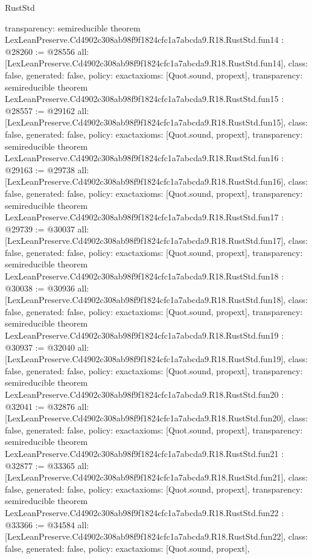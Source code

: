 \begin{lexlean}{RustStd}
\begin{coremodule}
{  transparency: semireducible
}
theorem LexLeanPreserve.Cd4902c308ab98f9f1824cfc1a7abcda9.R18.RustStd.fun14 : @28260 := @28556 {
  all: [LexLeanPreserve.Cd4902c308ab98f9f1824cfc1a7abcda9.R18.RustStd.fun14],
  class: false,
  generated: false,
  policy: exact{axioms: [Quot.sound, propext]},
  transparency: semireducible
}
theorem LexLeanPreserve.Cd4902c308ab98f9f1824cfc1a7abcda9.R18.RustStd.fun15 : @28557 := @29162 {
  all: [LexLeanPreserve.Cd4902c308ab98f9f1824cfc1a7abcda9.R18.RustStd.fun15],
  class: false,
  generated: false,
  policy: exact{axioms: [Quot.sound, propext]},
  transparency: semireducible
}
theorem LexLeanPreserve.Cd4902c308ab98f9f1824cfc1a7abcda9.R18.RustStd.fun16 : @29163 := @29738 {
  all: [LexLeanPreserve.Cd4902c308ab98f9f1824cfc1a7abcda9.R18.RustStd.fun16],
  class: false,
  generated: false,
  policy: exact{axioms: [Quot.sound, propext]},
  transparency: semireducible
}
theorem LexLeanPreserve.Cd4902c308ab98f9f1824cfc1a7abcda9.R18.RustStd.fun17 : @29739 := @30037 {
  all: [LexLeanPreserve.Cd4902c308ab98f9f1824cfc1a7abcda9.R18.RustStd.fun17],
  class: false,
  generated: false,
  policy: exact{axioms: [Quot.sound, propext]},
  transparency: semireducible
}
theorem LexLeanPreserve.Cd4902c308ab98f9f1824cfc1a7abcda9.R18.RustStd.fun18 : @30038 := @30936 {
  all: [LexLeanPreserve.Cd4902c308ab98f9f1824cfc1a7abcda9.R18.RustStd.fun18],
  class: false,
  generated: false,
  policy: exact{axioms: [Quot.sound, propext]},
  transparency: semireducible
}
theorem LexLeanPreserve.Cd4902c308ab98f9f1824cfc1a7abcda9.R18.RustStd.fun19 : @30937 := @32040 {
  all: [LexLeanPreserve.Cd4902c308ab98f9f1824cfc1a7abcda9.R18.RustStd.fun19],
  class: false,
  generated: false,
  policy: exact{axioms: [Quot.sound, propext]},
  transparency: semireducible
}
theorem LexLeanPreserve.Cd4902c308ab98f9f1824cfc1a7abcda9.R18.RustStd.fun20 : @32041 := @32876 {
  all: [LexLeanPreserve.Cd4902c308ab98f9f1824cfc1a7abcda9.R18.RustStd.fun20],
  class: false,
  generated: false,
  policy: exact{axioms: [Quot.sound, propext]},
  transparency: semireducible
}
theorem LexLeanPreserve.Cd4902c308ab98f9f1824cfc1a7abcda9.R18.RustStd.fun21 : @32877 := @33365 {
  all: [LexLeanPreserve.Cd4902c308ab98f9f1824cfc1a7abcda9.R18.RustStd.fun21],
  class: false,
  generated: false,
  policy: exact{axioms: [Quot.sound, propext]},
  transparency: semireducible
}
theorem LexLeanPreserve.Cd4902c308ab98f9f1824cfc1a7abcda9.R18.RustStd.fun22 : @33366 := @34584 {
  all: [LexLeanPreserve.Cd4902c308ab98f9f1824cfc1a7abcda9.R18.RustStd.fun22],
  class: false,
  generated: false,
  policy: exact{axioms: [Quot.sound, propext]},
}
\end{coremodule}
\end{lexlean}
